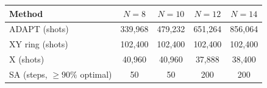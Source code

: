 \begin{tabular}{lcccc}
\toprule
Method & $N=8$ & $N=10$ & $N=12$ & $N=14$ \\
\midrule
ADAPT (shots) & 339,968 & 479,232 & 651,264 & 856,064 \\
XY ring (shots) & 102,400 & 102,400 & 102,400 & 102,400 \\
X (shots) & 40,960 & 40,960 & 37,888 & 38,400 \\
SA (steps, $\geq 90\%$ optimal) & 50 & 50 & 200 & 200 \\
\bottomrule
\end{tabular}
